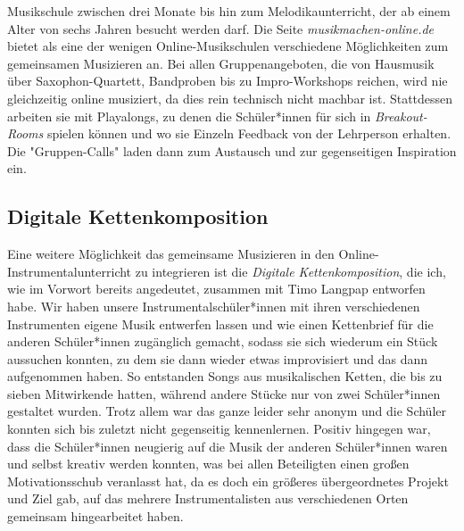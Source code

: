 Musikschule zwischen drei Monate bis hin zum Melodikaunterricht, der ab einem
Alter von sechs Jahren besucht werden darf. \autocite{online_musikschule_emp}
Die Seite \emph{musikmachen-online.de} bietet als eine der wenigen
Online-Musikschulen verschiedene Möglichkeiten zum gemeinsamen Musizieren an. \autocite{online_musikschule_mmo}
Bei allen Gruppenangeboten, die von Hausmusik über Saxophon-Quartett, Bandproben
bis zu Impro-Workshops reichen, wird nie gleichzeitig online musiziert, da dies
rein technisch nicht machbar ist. Stattdessen arbeiten sie mit Playalongs, zu denen die
Schüler*innen für sich in \emph{Breakout-Rooms} spielen können und wo sie Einzeln Feedback von der
Lehrperson erhalten. Die "Gruppen-Calls" laden dann zum Austausch und zur
gegenseitigen Inspiration ein. \autocite{online_musikschule_mmo}


\subsection{Digitale Kettenkomposition}
Eine weitere Möglichkeit das gemeinsame Musizieren in den
Online-Instrumentalunterricht zu integrieren ist die \emph{Digitale
Kettenkomposition}, die ich, wie im Vorwort bereits
angedeutet, zusammen mit Timo Langpap entworfen habe. Wir haben unsere
Instrumentalschüler*innen mit ihren verschiedenen Instrumenten eigene Musik entwerfen
lassen und wie einen Kettenbrief für die anderen Schüler*innen zugänglich
gemacht, sodass sie sich wiederum ein Stück aussuchen konnten, zu dem sie dann
wieder etwas improvisiert und das dann aufgenommen haben. So entstanden Songs
aus musikalischen Ketten, die bis zu sieben Mitwirkende hatten, während andere
Stücke nur von zwei Schüler*innen gestaltet wurden. Trotz allem war das ganze
leider sehr anonym und die Schüler konnten sich bis zuletzt nicht gegenseitig kennenlernen.
Positiv hingegen war, dass die Schüler*innen neugierig auf die Musik der anderen
Schüler*innen waren und selbst kreativ werden konnten, was bei allen Beteiligten einen
großen Motivationsschub veranlasst hat, da es doch ein größeres übergeordnetes
Projekt und Ziel gab, auf das mehrere Instrumentalisten aus verschiedenen Orten
gemeinsam hingearbeitet haben. 

